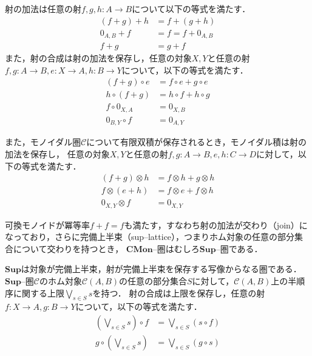 \documentclass[type_judgement.tex]{subfiles}
\begin{document}
射の加法は任意の射$f,g,h:A \rightarrow B$について以下の等式を満たす．
\begin{align*}
  (f + g) + h &= f + (g + h) \\
  0_{A,B} + f &= f = f + 0_{A,B} \\
  f + g &= g + f
\end{align*}
また，射の合成は射の加法を保存し，任意の対象$X,Y$と任意の射$f,g:A\rightarrow B, e:X \rightarrow A, h:B\rightarrow Y$について，以下の等式を満たす．
\begin{align*}
  (f+g) \circ e &= f \circ e + g \circ e \\
  h \circ (f+g) &= h \circ f + h \circ g \\
  f \circ 0_{X,A} &= 0_{X,B} \\
  0_{B,Y} \circ f &= 0_{A,Y}
\end{align*}


また，モノイダル圏$\mathcal{C}$について有限双積が保存されるとき，モノイダル積は射の加法を保存し，
任意の対象$X,Y$と任意の射$f,g:A \rightarrow B, e,h:C \rightarrow D$に対して，以下の等式を満たす．
\begin{align*}
  (f+g) \otimes h &= f \otimes h + g \otimes h \\
  f \otimes(e+h) &= f \otimes e + f \otimes h \\
  0_{X,Y} \otimes f &= 0_{X,Y}
\end{align*}

可換モノイドが冪等率$f+f=f$も満たす，すなわち射の加法が交わり（join）になっており，さらに完備上半束（sup--lattice），つまりホム対象の任意の部分集合について交わりを持つとき，
$\mathbf{CMon}$--圏はむしろ$\mathbf{Sup}$--圏である．

\begin{defn}\cite[Def. 1.3.(i)]{pitts_applications_1988}
$\mathbf{Sup}$は対象が完備上半束，射が完備上半束を保存する写像からなる圏である．
$\mathbf{Sup}$--圏$\mathcal{C}$のホム対象$\mathcal{C}(A,B)$の任意の部分集合$S$に対して，$\mathcal{C}(A,B)$上の半順序に関する上限$\bigvee_{s\in S}s$を持つ．
射の合成は上限を保存し，任意の射$f:X \rightarrow A,g: B \rightarrow Y$について，以下の等式を満たす．
\begin{align*}
  \left(\bigvee_{s\in S}s\right) \circ f &= \bigvee_{s\in S}\left(s \circ f\right) \\
  g \circ \left(\bigvee_{s\in S}s\right) &= \bigvee_{s\in S}\left(g \circ s\right)
\end{align*}
\end{defn}
\end{document}
